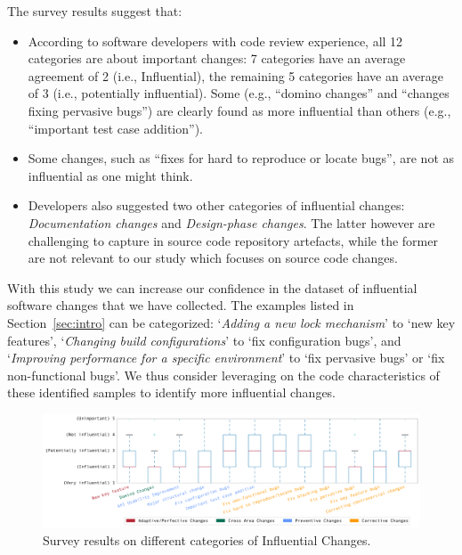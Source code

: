 The survey results suggest that:
\begin{itemize}
	\item According to software developers with code review experience, all 12 categories are about important changes: 7 categories have an average agreement of 2 (i.e., Influential), the remaining 5 categories have an average of 3 (i.e., potentially influential). Some (e.g.,  ``domino changes'' and ``changes fixing pervasive bugs'') are clearly found as more influential than others (e.g., ``important test case addition'').
	\item Some changes, such as ``fixes for hard to reproduce or locate bugs'', are not as influential as one might think.
	\item Developers also suggested two other categories of influential changes: {\em Documentation changes} and {\em Design-phase changes}. The latter however are challenging to capture in source code repository artefacts, while the former are not relevant to our study which focuses on source code changes.
\end{itemize}

With this study we can increase our confidence in the dataset of influential
software changes that we have collected. The examples listed in Section~\ref{sec:intro} can be categorized: `\textit{Adding a new lock mechanism}' to `new key features', `\textit{Changing build configurations}' to `fix configuration bugs', and `\textit{Improving performance for a specific environment}' to `fix pervasive bugs' or `fix non-functional bugs'.
We thus consider leveraging on the
code characteristics of these identified samples to identify more influential
changes.




\begin{landscape}

 \begin{figure}
 \centering
\scriptsize
\includegraphics[width=\linewidth]{fig/response-boxplot.pdf}
\caption{Survey results on different categories of Influential Changes.}
\label{fig:survey}
 \end{figure}

\end{landscape}

